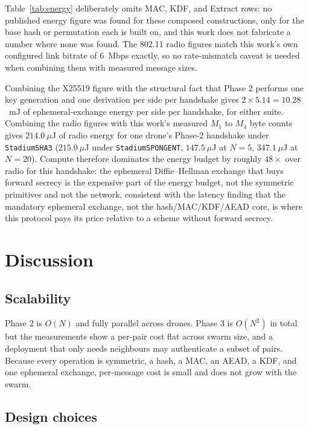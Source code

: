 \documentclass[journal]{IEEEtran}
\begin{document}
Table~\ref{tab:energy} deliberately omits MAC, KDF, and Extract rows: no
published energy figure was found for these composed constructions, only for
the base hash or permutation each is built on, and this work does not fabricate
a number where none was found. The 802.11 radio figures match this work's own
configured link bitrate of 6~Mbps exactly, so no rate-mismatch caveat is needed
when combining them with measured message sizes.

Combining the X25519 figure with the structural fact that Phase 2 performs one
key generation and one derivation per side per handshake gives $2 \times 5.14
= 10.28$~mJ of ephemeral-exchange energy per side per handshake, for either
suite. Combining the radio figures with this work's measured $M_1$ to $M_4$
byte counts gives $214.0~\mu$J of radio energy for one drone's Phase-2 handshake
under \texttt{StadiumSHA3} ($215.0~\mu$J under \texttt{StadiumSPONGENT},
$147.5~\mu$J at $N=5$, $347.1~\mu$J at $N=20$). Compute therefore dominates the
energy budget by roughly $48\times$ over radio for this handshake: the
ephemeral Diffie--Hellman exchange that buys forward secrecy is the expensive
part of the energy budget, not the symmetric primitives and not the network,
consistent with the latency finding that the mandatory ephemeral exchange, not
the hash/MAC/KDF/AEAD core, is where this protocol pays its price relative to a
scheme without forward secrecy.

\section{Discussion}
\label{sec:discussion}

\subsection{Scalability}

Phase 2 is $O(N)$ and fully parallel across drones. Phase 3 is $O(N^2)$ in
total but the measurements show a per-pair cost flat across swarm size, and a
deployment that only needs neighbours may authenticate a subset of pairs.
Because every operation is symmetric, a hash, a MAC, an AEAD, a KDF, and one
ephemeral exchange, per-message cost is small and does not grow with the swarm.

\subsection{Design choices}
\end{document}
